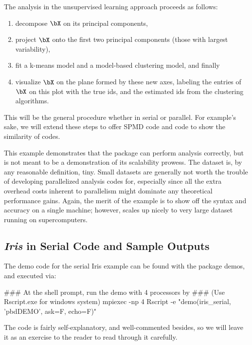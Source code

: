 The analysis in the unsupervised learning approach proceeds as follows:
\begin{enumerate}
\item decompose $\bX$ on its principal components,
\item project $\bX$ onto the first two principal components
      (those with largest variability),
\item fit a k-means model and a model-based clustering model, and finally
\item visualize $\bX$ on the plane formed by these new axes, labeling the
      entries of $\bX$ on this plot with the true ids, and the estimated
      ids from the clustering algorithms.
\end{enumerate}
This will be the general procedure whether in serial or parallel.
For example's sake, we will extend these steps
to offer SPMD code and  code to show the similarity of codes.

This example demonstrates that the
 package
can perform analysis correctly, but is not
meant to be a demonstration of its scalability prowess.
The  dataset is, by any reasonable definition, tiny.
Small datasets are generally not worth the trouble of developing
parallelized analysis codes for, especially since all the extra
overhead costs inherent to parallelism might dominate any theoretical
performance gains. Again, the merit of the example is to show off
the syntax and accuracy on a single machine; however, 
scales up nicely to very large dataset running on supercomputers.



\subsection{{\it Iris} in Serial Code and Sample Outputs}

The demo code for the serial Iris example can be found with the package
demos, and executed via:
\begin{Command}
### At the shell prompt, run the demo with 4 processors by
### (Use Rscript.exe for windows system)
mpiexec -np 4 Rscript -e "demo(iris_serial, 'pbdDEMO', ask=F, echo=F)"
\end{Command}

The code is fairly self-explanatory, and well-commented besides, so we will
leave it as an exercise to the reader to read through it carefully.

